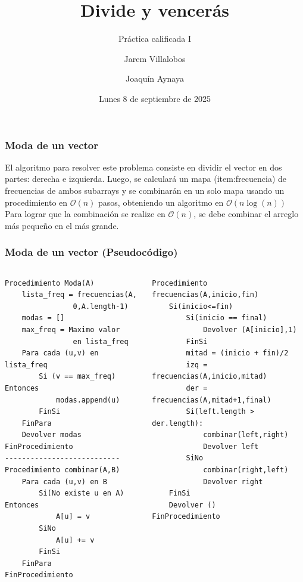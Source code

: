 \documentclass[10pt]{beamer}
\title[PC1]{Divide y vencerás}
\subtitle{Práctica calificada I}
\author{Jarem Villalobos\inst{1} \and Joaquín Aynaya\inst{2}}
\date[8/09/2025]{Lunes 8 de septiembre de 2025}
\begin{document}
    \frame{\titlepage}
    \begin{frame}
        \frametitle{Moda de un vector}
        El algoritmo para resolver este problema consiste en dividir el vector en dos partes: derecha e izquierda. Luego, se calculará
        un mapa (item:frecuencia) de frecuencias de ambos subarrays y se combinarán en un solo mapa usando un procedimiento en $\mathcal{O}(n)$ pasos,
        obteniendo un algoritmo en $\mathcal{O}(n\log(n))$
        Para lograr que la combinación se realize en $\mathcal{O}(n)$, se debe combinar el arreglo más pequeño en el más grande.
    \end{frame}
    \begin{frame}[fragile]
        \frametitle{Moda de un vector (Pseudocódigo)}
         \begin{columns}
            \begin{column}{0.50\textwidth}
               \begin{lstlisting}[basicstyle=\ttfamily\scriptsize]
Procedimiento Moda(A)
    lista_freq = frecuencias(A,
                0,A.length-1)
    modas = []
    max_freq = Maximo valor 
                en lista_freq
    Para cada (u,v) en lista_freq
        Si (v == max_freq) Entonces 
            modas.append(u)
        FinSi
    FinPara
    Devolver modas
FinProcedimiento
---------------------------
Procedimiento combinar(A,B)
    Para cada (u,v) en B
        Si(No existe u en A) Entonces
            A[u] = v 
        SiNo
            A[u] += v
        FinSi
    FinPara
FinProcedimiento
               \end{lstlisting} 
            \end{column}
            \begin{column}{0.60\textwidth}
                \begin{lstlisting}[basicstyle=\ttfamily\scriptsize]
Procedimiento frecuencias(A,inicio,fin)
    Si(inicio<=fin)
        Si(inicio == final)
            Devolver (A[inicio],1)
        FinSi
        mitad = (inicio + fin)/2
        izq = frecuencias(A,inicio,mitad)
        der = frecuencias(A,mitad+1,final)
        Si(left.length > der.length):
            combinar(left,right)
            Devolver left
        SiNo
            combinar(right,left)
            Devolver right
    FinSi
    Devolver ()
FinProcedimiento
               \end{lstlisting} 
            \end{column}
         \end{columns}
    \end{frame}
\end{document}
